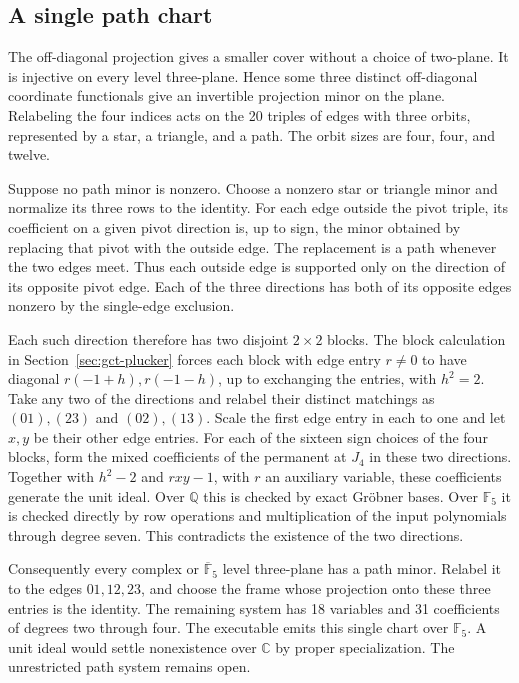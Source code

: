 \subsection{A single path chart}
\label{sec:gct-path}

The off-diagonal projection gives a smaller cover without a choice of
two-plane. It is injective on every level three-plane. Hence some
three distinct off-diagonal coordinate functionals give an invertible
projection minor on the plane. Relabeling the four indices acts on
the 20 triples of edges with three orbits, represented by a star, a
triangle, and a path. The orbit sizes are four, four, and twelve.

Suppose no path minor is nonzero. Choose a nonzero star or triangle
minor and normalize its three rows to the identity. For each edge
outside the pivot triple, its coefficient on a given pivot direction
is, up to sign, the minor obtained by replacing that pivot with the
outside edge. The replacement is a path whenever the two edges meet.
Thus each outside edge is supported only on the direction of its
opposite pivot edge. Each of the three directions has both of its
opposite edges nonzero by the single-edge exclusion.

Each such direction therefore has two disjoint \(2\times2\) blocks.
The block calculation in Section~\ref{sec:gct-plucker} forces each
block with edge entry \(r\ne0\) to have diagonal
\(r(-1+h),r(-1-h)\), up to exchanging the entries, with \(h^2=2\).
Take any two of the directions and relabel their distinct matchings
as \((01),(23)\) and \((02),(13)\). Scale the first edge entry in
each to one and let \(x,y\) be their other edge entries. For each of
the sixteen sign choices of the four blocks, form the mixed
coefficients of the permanent at \(J_4\) in these two directions.
Together with \(h^2-2\) and \(rxy-1\), with \(r\) an auxiliary
variable, these coefficients generate the unit ideal. Over
\(\mathbb Q\) this is checked by exact Gr\"obner bases. Over
\(\mathbb F_5\) it is checked directly by row operations and
multiplication of the input polynomials through degree seven.
This contradicts the existence of the two directions.

Consequently every complex or \(\overline{\mathbb F}_5\) level
three-plane has a path minor. Relabel it to the edges \(01,12,23\),
and choose the frame whose projection onto these three entries is
the identity. The remaining system has 18 variables and 31
coefficients of degrees two through four. The executable emits this
single chart over \(\mathbb F_5\). A unit ideal would settle
nonexistence over \(\mathbb C\) by proper specialization. The
unrestricted path system remains open.


